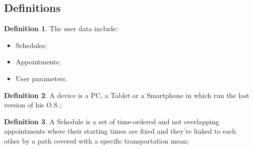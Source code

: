 \subsection{Definitions}
\theoremstyle{definition}
\newtheorem{definition}{Definition}[section]
 
\begin{definition} \label{def:userdata}
The user data include:
\begin{itemize}
\item Schedules;
\item Appointments;
\item User parameters.
\end{itemize}

\end{definition}
  
%
\begin{definition} \label{def:device}
A device is a PC, a Tablet or a Smartphone in which run the last version of his O.S.;
\end{definition}

%
%
%
\begin{definition} \label{def:schedule}
A Schedule is a set of time-ordered and not overlapping appointments where their starting times are fixed and they're linked to each other by a path covered with a specific transportation mean;
\end{definition}



